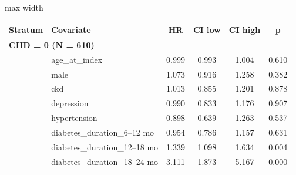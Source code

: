 \documentclass[twoside,11pt]{article}
\begin{document}
\begin{table}[H]
  \centering
  \begin{adjustbox}{max width=\textwidth}
    \begin{tabular}{llcccc}
      \hline
      \textbf{Stratum} & \textbf{Covariate}            & \textbf{HR} & \textbf{CI low} & \textbf{CI high} & \textbf{p}                  \\
      \hline

      \multicolumn{6}{l}{\textbf{CHD = 0 (N = 610)}}                                                                                    \\
                       & age\_at\_index                & 0.999       & 0.993           & 1.004            & 0.610                       \\
                       & male                          & 1.073       & 0.916           & 1.258            & 0.382                       \\
                       & ckd                           & 1.013       & 0.855           & 1.201            & 0.878                       \\
                       & depression                    & 0.990       & 0.833           & 1.176            & 0.907                       \\
                       & hypertension                  & 0.898       & 0.639           & 1.263            & 0.537                       \\
                       & diabetes\_duration\_6--12 mo  & 0.954       & 0.786           & 1.157            & 0.631                       \\
                       & diabetes\_duration\_12--18 mo & 1.339       & 1.098           & 1.634            & \cellcolor{lightgreen}0.004 \\
                       & diabetes\_duration\_18--24 mo & 3.111       & 1.873           & 5.167            & \cellcolor{lightgreen}0.000 \\


\end{tabular}
\end{adjustbox}
\end{table}
\end{document}
